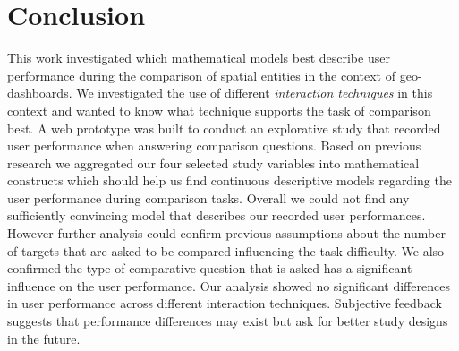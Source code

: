 \chapter{Conclusion}
This work investigated which mathematical models best describe user performance during the comparison of spatial entities in the context
of geo-dashboards. We investigated the use of different \textit{interaction techniques} in this context and wanted to know what technique
supports the task of comparison best. A web prototype was built to conduct an explorative study that recorded user performance when answering 
comparison questions. Based on previous research we aggregated our four selected study variables into mathematical constructs
which should help us find continuous descriptive models regarding the user performance during comparison tasks. Overall we could not find
any sufficiently convincing model that describes our recorded user performances. However further analysis could confirm previous assumptions
about the number of targets that are asked to be compared influencing the task difficulty. We also confirmed the type of comparative
question that is asked has a significant influence on the user performance. Our analysis showed no significant differences in user performance
across different interaction techniques. Subjective feedback suggests that performance differences may exist but ask for better study designs in the
future.
